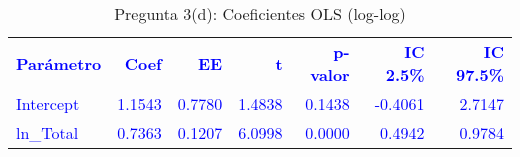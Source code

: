 \begin{table}[H]
\centering
\caption{Pregunta 3(d): Coeficientes OLS (log-log)}
\label{tab:q3d_loglog_coefs}
\begin{tabular}{lrrrrrr}
\rowcolor{blue!10}
\toprule
\rowcolor{blue!20}
\textcolor{blue}{\textbf{Parámetro}} & \textcolor{blue}{\textbf{Coef}} & \textcolor{blue}{\textbf{EE}} & \textcolor{blue}{\textbf{t}} & \textcolor{blue}{\textbf{p-valor}} & \textcolor{blue}{\textbf{IC 2.5\%}} & \textcolor{blue}{\textbf{IC 97.5\%}} \\
\addlinespace
\rowcolor{blue!10}
\textcolor{blue}{Intercept} & \textcolor{blue}{1.1543} & \textcolor{blue}{0.7780} & \textcolor{blue}{1.4838} & \textcolor{blue}{0.1438} & \textcolor{blue}{-0.4061} & \textcolor{blue}{2.7147} \\
\rowcolor{blue!10}
\textcolor{blue}{ln\_Total} & \textcolor{blue}{0.7363} & \textcolor{blue}{0.1207} & \textcolor{blue}{6.0998} & \textcolor{blue}{0.0000} & \textcolor{blue}{0.4942} & \textcolor{blue}{0.9784} \\
\bottomrule
\end{tabular}
\end{table}
